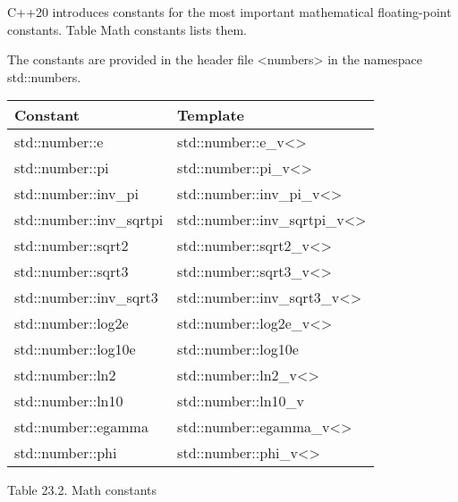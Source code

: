 C++20 introduces constants for the most important mathematical floating-point constants. Table Math constants lists them.

The constants are provided in the header file <numbers> in the namespace std::numbers.

\begin{longtable}[c]{|l|l|}
\hline
\textbf{Constant}        & \textbf{Template}                                    \\ \hline
\endfirsthead
%
\endhead
%
std::number::e           & std::number::e\_v\textless{}\textgreater{}           \\ \hline
std::number::pi          & std::number::pi\_v\textless{}\textgreater{}          \\ \hline
std::number::inv\_pi     & std::number::inv\_pi\_v\textless{}\textgreater{}     \\ \hline
std::number::inv\_sqrtpi & std::number::inv\_sqrtpi\_v\textless{}\textgreater{} \\ \hline
std::number::sqrt2       & std::number::sqrt2\_v\textless{}\textgreater{}       \\ \hline
std::number::sqrt3       & std::number::sqrt3\_v\textless{}\textgreater{}       \\ \hline
std::number::inv\_sqrt3  & std::number::inv\_sqrt3\_v\textless{}\textgreater{}  \\ \hline
std::number::log2e       & std::number::log2e\_v\textless{}\textgreater{}       \\ \hline
std::number::log10e      & std::number::log10e                                  \\ \hline
std::number::ln2         & std::number::ln2\_v\textless{}\textgreater{}         \\ \hline
std::number::ln10        & std::number::ln10\_v                                 \\ \hline
std::number::egamma      & std::number::egamma\_v\textless{}\textgreater{}      \\ \hline
std::number::phi         & std::number::phi\_v\textless{}\textgreater{}         \\ \hline
\end{longtable}

\begin{center}
Table 23.2. Math constants
\end{center}

